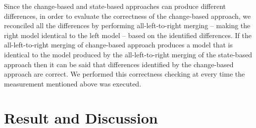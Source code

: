 \documentclass{llncs}
\begin{document}
Since the change-based and state-based approaches can produce different differences, in order to evaluate the correctness of the change-based approach, we reconciled all the differences by performing all-left-to-right merging -- making the right model identical to the left model -- based on the identified differences. If the all-left-to-right merging of change-based approach produces a model that is identical to the model produced by the all-left-to-right merging of the state-based approach then it can be said that differences identified by the change-based approach are correct. We performed this correctness checking at every time the measurement mentioned above was executed.

\section{Result and Discussion}
\label{sec:discussion}
\end{document}
